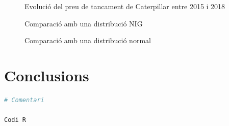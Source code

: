 \documentclass{article}
\numberwithin{table}{section}
\numberwithin{figure}{section}
\numberwithin{equation}{section}
\begin{document}
\begin{figure}[H]
	\centering \sffamily \small
	
	\caption{Evolució del preu de tancament de Caterpillar entre 2015 i 2018}
	\label{fig:distribucio rendibilitats}
\end{figure}
\begin{figure}[H]
	\centering \sffamily \small
	
	\caption{Comparació amb una distribució NIG}
	\label{fig:comparacio nig}
\end{figure}
\begin{figure}[H]
	\centering \sffamily \small
	
	\caption{Comparació amb una distribució normal}
	\label{fig:comparacio normal}
\end{figure}

\section{Conclusions}
\newpage







\begin{lstlisting}[language=R]
# Comentari

Codi R
\end{lstlisting}

%
%
\printbibliography[heading = biblio]
\end{document}
